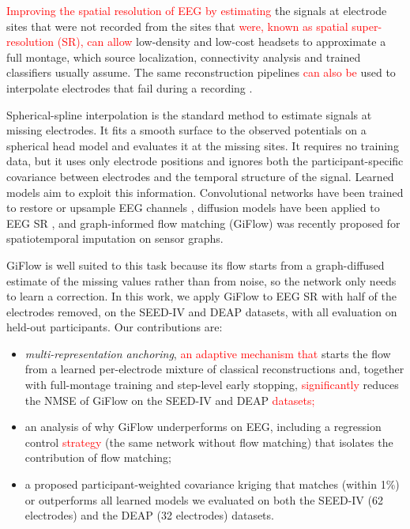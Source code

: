 \documentclass{article}
\begin{document}
\textcolor{red}{Improving the spatial resolution of EEG by estimating} the signals at
electrode sites that were not recorded from the sites that \textcolor{red}{were, known as
spatial super-resolution (SR), can allow} low-density and low-cost headsets
to approximate a full montage, which source localization, connectivity
analysis and trained classifiers usually assume. The same reconstruction
pipelines \textcolor{red}{can also be} used to interpolate electrodes that fail during a
recording \cite{bigdely2015prep}.

Spherical-spline interpolation \cite{perrin1989spherical} is the standard
method to estimate signals at missing electrodes. It fits a smooth surface
to the observed potentials on a spherical head model and evaluates it at
the missing sites. It requires no training data, but it uses only
electrode positions and ignores both the participant-specific covariance
between electrodes and the temporal structure of the signal. Learned
models aim to exploit this information. Convolutional networks have been
trained to restore or upsample EEG channels \cite{svantesson2021virtual},
diffusion models have been applied to EEG SR \cite{liu2026srgdiff}, and
graph-informed flow matching (GiFlow) \cite{zhang2026giflow} was recently
proposed for spatiotemporal imputation on sensor graphs.

GiFlow is well suited to this task because its flow
\cite{lipman2023flow} starts from a graph-diffused estimate of the missing
values rather than from noise, so the network only needs to learn a
correction. In this work, we apply GiFlow to EEG SR with half of the
electrodes removed, on the SEED-IV \cite{zheng2019emotionmeter} and DEAP
\cite{koelstra2012deap} datasets, with all evaluation on held-out
participants. Our contributions are:
\begin{itemize}
\setlength{\itemsep}{0pt}
\item \emph{multi-representation anchoring}, \textcolor{red}{an adaptive mechanism that}
starts the flow from a learned per-electrode mixture of classical
reconstructions and, together with full-montage training and step-level
early stopping, \textcolor{red}{significantly} reduces the NMSE of GiFlow on the SEED-IV
and DEAP \textcolor{red}{datasets;}
\item an analysis of why GiFlow underperforms on EEG, including a
regression control \textcolor{red}{strategy} (the same network without flow matching) that
isolates the contribution of flow matching;
\item a proposed participant-weighted covariance kriging that matches
(within 1\%) or outperforms all learned models we evaluated on both the SEED-IV (62 electrodes) and the DEAP
(32 electrodes) datasets.
\end{itemize}
\end{document}
